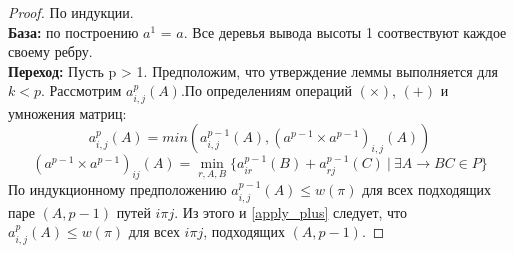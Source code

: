 \documentclass[14pt]{matmex-diploma}
\theoremstyle{definition}
\begin{document}
       \begin{proof}
           По индукции.\\
           \textbf{База:} по построению $a^1$ = $a$. Все деревья вывода высоты 1 соотвествуют каждое своему ребру.\\
           \textbf{Переход:} Пусть p > 1. Предположим, что утверждение леммы выполняется для $k < p$. Рассмотрим $a^p_{i,j}(A)$.По определениям операций $(\times)$, $(+)$ и умножения матриц:
           \begin{equation}\label{apply_plus}
               a^p_{i,j}(A) = min(a^{p-1}_{i,j}(A), (a^{p-1}\times a^{p-1})_{i,j}(A))
           \end{equation}
           \begin{equation}\label{apply_times}
                (a^{p-1}\times a^{p-1})_{ij}(A) = \min_{r,A,B}\{a^{p-1}_{ir}(B) + a^{p-1}_{rj}(C)~|~\exists A\rightarrow BC \in P\}
           \end{equation}                                 
           По индукционному предположению $a^{p-1}_{i,j}(A) \le w(\pi)$ для всех подходящих паре $(A, p-1)$ путей $i\pi j$. Из этого и \eqref{apply_plus} следует, что $a^p_{i,j}(A) \le w(\pi)$ для всех $i\pi j$, подходящих $(A, p-1)$.
           

\end{proof}
\end{document}

